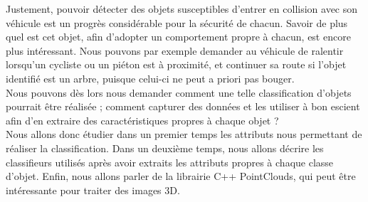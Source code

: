 Justement, pouvoir détecter des objets susceptibles d'entrer en collision avec son véhicule est un progrès considérable pour la sécurité de chacun. Savoir de plus quel est cet objet, afin d'adopter un comportement propre à chacun, est encore plus intéressant. Nous pouvons par exemple demander au véhicule de ralentir lorsqu'un cycliste ou un piéton est à proximité, et continuer sa route si l'objet identifié est un arbre, puisque celui-ci ne peut a priori pas bouger.\\

Nous pouvons dès lors nous demander comment une telle classification d'objets pourrait être réalisée ; comment capturer des données et les utiliser à bon escient afin d'en extraire des caractéristiques propres à chaque objet ?\\

Nous allons donc étudier dans un premier temps les attributs nous permettant de réaliser la classification. Dans un deuxième temps, nous allons décrire les classifieurs utilisés après avoir extraits les attributs propres à chaque classe d'objet. Enfin, nous allons parler de la librairie C++ PointClouds, qui peut être intéressante pour traiter des images 3D.\\